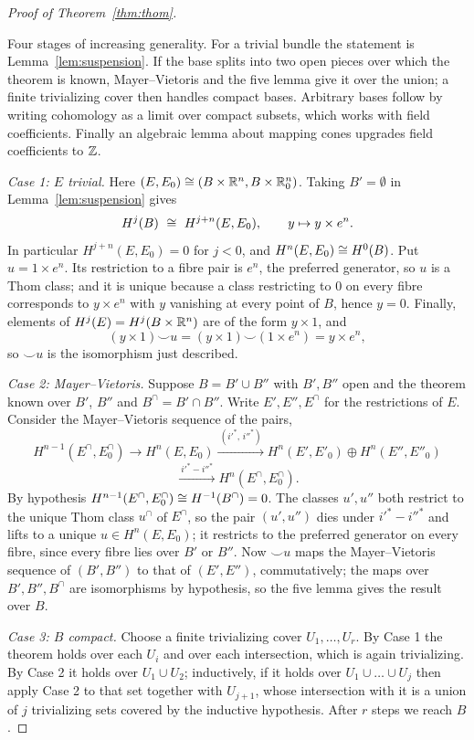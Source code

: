 \begin{proof}[Proof of Theorem~\ref{thm:thom}]
\begin{strategy}
Four stages of increasing generality. For a trivial bundle the statement is
Lemma~\ref{lem:suspension}. If the base splits into two open pieces over which
the theorem is known, Mayer--Vietoris and the five lemma give it over the union;
a finite trivializing cover then handles compact bases. Arbitrary bases follow
by writing cohomology as a limit over compact subsets, which works with field
coefficients. Finally an algebraic lemma about mapping cones upgrades field
coefficients to $\mathbb{Z}$.
\end{strategy}

 \emph{Case 1: $E$ trivial.} Here
$(E,E_0)\cong(B\times\mathbb{R}^n,B\times\mathbb{R}^n_0)$. Taking $B'=\emptyset$ in
Lemma~\ref{lem:suspension} gives
\[
H^j(B)\ \cong\ H^{j+n}(E,E_0),\qquad y\mapsto y\times e^n .
\]
In particular $H^{j+n}(E,E_0)=0$ for $j<0$, and $H^n(E,E_0)\cong H^0(B)$. Put
$u=1\times e^n$. Its restriction to a fibre pair is $e^n$, the preferred
generator, so $u$ is a Thom class; and it is unique because a class restricting
to $0$ on every fibre corresponds to $y\times e^n$ with $y$ vanishing at every
point of $B$, hence $y=0$. Finally, elements of $H^j(E)=H^j(B\times\mathbb{R}^n)$ are of
the form $y\times1$, and
\[
(y\times1)\smile u=(y\times1)\smile(1\times e^n)=y\times e^n,
\]
so $\smile u$ is the isomorphism just described.

 \emph{Case 2: Mayer--Vietoris.} Suppose $B=B'\cup B''$ with $B',B''$
open and the theorem known over $B'$, $B''$ and $B^\cap=B'\cap B''$. Write
$E',E'',E^\cap$ for the restrictions of $E$. Consider the Mayer--Vietoris
sequence of the pairs,
\[
H^{n-1}(E^\cap,E_0^\cap)\longrightarrow H^n(E,E_0)
\xrightarrow{\ (i'^*,\,i''^*)\ }H^n(E',E'_0)\oplus H^n(E'',E''_0)
\]
\[
\xrightarrow{\ i'^*-i''^*\ }H^n(E^\cap,E^\cap_0).
\]
By hypothesis $H^{n-1}(E^\cap,E^\cap_0)\cong H^{-1}(B^\cap)=0$. The classes
$u',u''$ both restrict to the unique Thom class $u^\cap$ of $E^\cap$, so the
pair $(u',u'')$ dies under $i'^*-i''^*$ and lifts to a unique
$u\in H^n(E,E_0)$; it restricts to the preferred generator on every fibre, since
every fibre lies over $B'$ or $B''$. Now $\smile u$ maps the Mayer--Vietoris
sequence of $(B',B'')$ to that of $(E',E'')$, commutatively; the maps over
$B',B'',B^\cap$ are isomorphisms by hypothesis, so the five lemma gives the
result over $B$.

 \emph{Case 3: $B$ compact.} Choose a finite trivializing cover
$U_1,\dots,U_r$. By Case 1 the theorem holds over each $U_i$ and over each
intersection, which is again trivializing. By Case 2 it holds over
$U_1\cup U_2$; inductively, if it holds over $U_1\cup\dots\cup U_j$ then apply
Case 2 to that set together with $U_{j+1}$, whose intersection with it is a
union of $j$ trivializing sets covered by the inductive hypothesis. After $r$
steps we reach $B$.


\end{proof}
